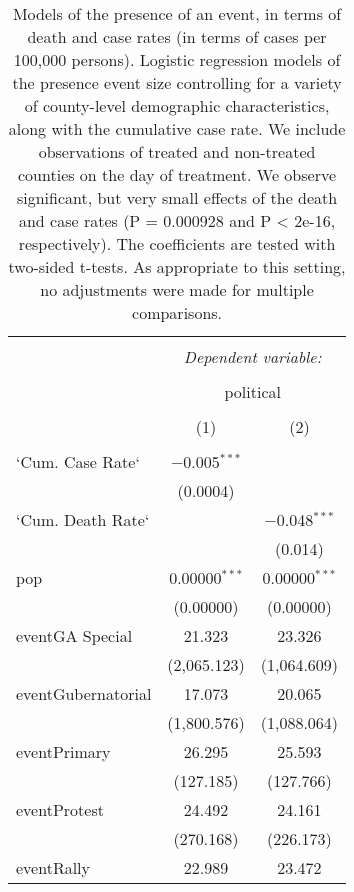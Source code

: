 
\begin{table}[!htbp] \centering 
  \caption{Models of the presence of an event, in terms of death and case rates (in terms of cases per 100,000 persons). Logistic regression models of the presence event size controlling for a variety of county-level demographic characteristics, along with the cumulative case rate. We include observations of treated and non-treated counties on the day of treatment. We observe significant, but very small effects of the death and case rates (P = 0.000928 and P < 2e-16, respectively). The coefficients are tested with two-sided t-tests. As appropriate to this setting, no adjustments were made for multiple comparisons.} 
  \label{tbl-event}
\tiny 
\begin{tabular}{@{\extracolsep{5pt}}lcc} 
\\[-1.8ex]\hline 
\hline \\[-1.8ex] 
 & \multicolumn{2}{c}{\textit{Dependent variable:}} \\ 
\cline{2-3} 
\\[-1.8ex] & \multicolumn{2}{c}{political} \\ 
\\[-1.8ex] & (1) & (2)\\ 
\hline \\[-1.8ex] 
 `Cum. Case Rate` & $-$0.005$^{***}$ &  \\ 
  & (0.0004) &  \\ 
  `Cum. Death Rate` &  & $-$0.048$^{***}$ \\ 
  &  & (0.014) \\ 
  pop & 0.00000$^{***}$ & 0.00000$^{***}$ \\ 
  & (0.00000) & (0.00000) \\ 
  eventGA Special & 21.323 & 23.326 \\ 
  & (2,065.123) & (1,064.609) \\ 
  eventGubernatorial & 17.073 & 20.065 \\ 
  & (1,800.576) & (1,088.064) \\ 
  eventPrimary & 26.295 & 25.593 \\ 
  & (127.185) & (127.766) \\ 
  eventProtest & 24.492 & 24.161 \\ 
  & (270.168) & (226.173) \\ 
  eventRally & 22.989 & 23.472 \\ 

\end{tabular}
\end{table}
